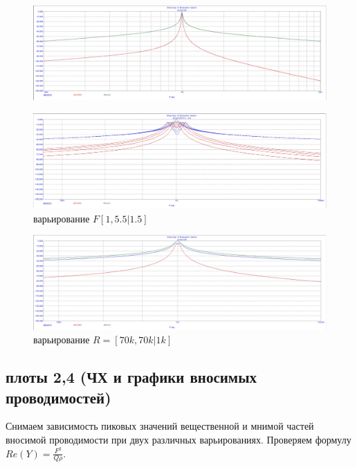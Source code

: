 \documentclass[a4paper, 14pt]{extarticle}%
\begin{document}
\begin{figure}[h!]
	\centering
			\includegraphics[width=1.1\linewidth]{1.8.jpg}
	\label{A}
\end{figure}

\begin{figure}[h!]
	\centering
			\includegraphics[width=1.1\linewidth]{1.8_VarF.jpg}
            \caption{варьирование $F [1, 5.5|1.5]$}
	\label{A}
\end{figure}
\newpage
\begin{figure}[h!]
	\centering
			\includegraphics[width=1.1\linewidth]{1.8_VarR.jpg}
            \caption{варьирование $R = [70k, 70k|1k]$}
	\label{A}
\end{figure}

\subsection{плоты 2,4 (ЧХ и графики вносимых проводимостей)}

Снимаем зависимость пиковых значений вещественной и мнимой частей вносимой проводимости при двух различных варьированиях.
\newline
Проверяем формулу $Re(Y) = \frac{F^{2}}{Q\rho}$.
\end{document}
